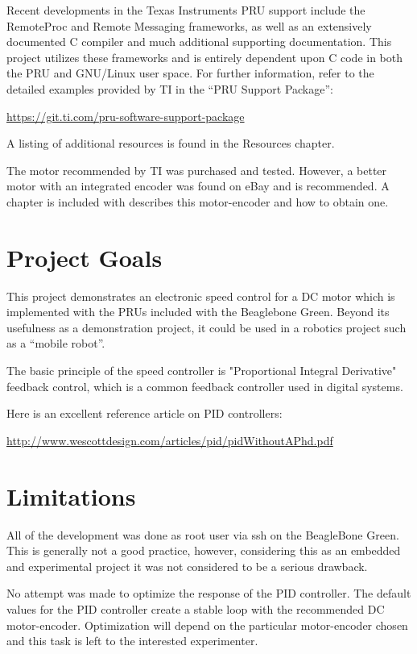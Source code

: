 Recent developments in the Texas Instruments PRU support include the RemoteProc and Remote Messaging frameworks, as well as an extensively documented C compiler and much additional supporting documentation.  This project utilizes these frameworks and is entirely dependent upon C code in both the PRU and GNU/Linux user space.  For further information, refer to the detailed examples provided by TI in the ``PRU Support Package'':

\url{https://git.ti.com/pru-software-support-package}

A listing of additional resources is found in the Resources chapter.

The motor recommended by TI was purchased and tested.  However, a better motor with an integrated encoder was found on eBay and is recommended.  A chapter is included with describes this motor-encoder and how to obtain one.

\section{Project Goals}

This project demonstrates an electronic speed control for a DC motor which is implemented with the PRUs included with the Beaglebone Green.  Beyond its usefulness as a demonstration project, it could be used in a robotics project such as a ``mobile robot''.

The basic principle of the speed controller is "Proportional Integral Derivative" feedback control, which is a common feedback controller used in digital systems.

Here is an excellent reference article on PID controllers:

\url{http://www.wescottdesign.com/articles/pid/pidWithoutAPhd.pdf}

\section{Limitations}

All of the development was done as root user via ssh on the BeagleBone Green.  This is generally not a good practice, however, considering this as an embedded and experimental project it was not considered to be a serious drawback.

No attempt was made to optimize the response of the PID controller.  The default values for the PID controller create a stable loop with the recommended DC motor-encoder.  Optimization will depend on the particular motor-encoder chosen and this task is left to the interested experimenter.


